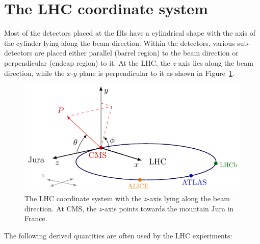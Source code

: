 \section{The LHC coordinate system}
\label{s:lhc_cord}
Most of the detectors placed at the IRs have a cylindrical shape with the axis of
the cylinder lying along the beam direction. Within the detectors, various sub-detectors are placed
either parallel (barrel region) to the beam direction or perpendicular (endcap region) to it.
At the LHC, the $z$-axis lies along the beam direction, while the $x$-$y$ plane is perpendicular 
to it as shown in Figure~\ref{fig:lhc_cord}. 
\begin{figure}
  \begin{center}
  \includegraphics[width=0.50\linewidth]{Experiment/LHC/Image/cord.pdf}
  \caption{The LHC coordinate system \cite{CMSWiki} with the $z$-axis lying along the beam direction. 
	At CMS, the $z$-axis points towards the mountain Jura in France.}
  \label{fig:lhc_cord}
  \end{center}
\end{figure}
The following derived quantities are often used by the LHC experiments:
